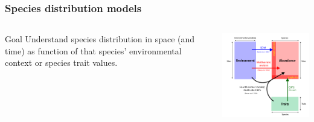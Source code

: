 \documentclass{beamer}
\begin{document}
\begin{frame}
  \frametitle{Species distribution models}

  \begin{columns}
    \begin{column}{0.5\textwidth}
      \begin{block}{Goal}
        Understand species distribution in space (and time) as function of that species' environmental context or species trait values.
      \end{block}
    \end{column}
    \begin{column}{0.5\textwidth}
      \begin{center}
        \includegraphics[width = \textwidth,height = 0.5\textheight,keepaspectratio = true]{figure/warton_corner_models}
      \end{center}
    \end{column}
  \end{columns}


  \tiny{}
\end{frame}
\end{document}

